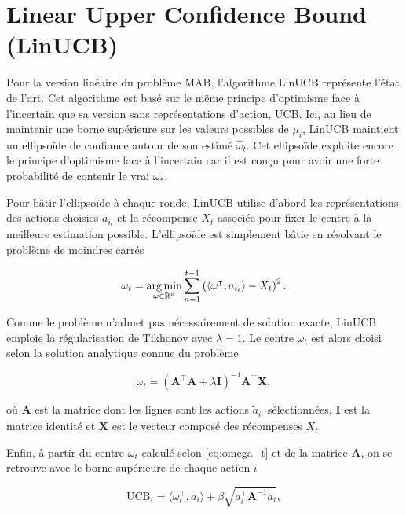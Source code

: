 \section{Linear Upper Confidence Bound (LinUCB)}

Pour la version linéaire du problème MAB, l'algorithme LinUCB \citep{chu2011contextual}
représente l'état de l'art.
Cet algorithme est basé sur le même principe d'optimisme face à l'incertain que
sa version sans représentations d'action, UCB.
Ici, au lieu de maintenir une borne supérieure sur les valeurs possibles de
$\mu_i$, LinUCB maintient un ellipsoïde de confiance autour de son estimé
$\hat{\omega}_t$.
Cet ellipsoïde exploite encore le principe d'optimisme face à l'incertain car il
est conçu pour avoir une forte probabilité de contenir le vrai $\omega_*$.

Pour bâtir l'ellipsoïde à chaque ronde, LinUCB utilise d'abord les
représentations des actions choisies $\tilde{a}_{i_t}$ et la récompense $X_t$ associée pour
fixer le centre à la meilleure estimation possible.
L'ellipsoïde est simplement bâtie en résolvant le problème de moindres carrés

\begin{equation}
    \omega_t = \operatorname*{arg\,min}_{\omega \in \mathbb{R}^n} \sum_{n=1}^{t-1} \left( \langle \omega^\intercal, a_{i_t} \rangle - X_t \right)^2.
\end{equation}

Comme le problème n'admet pas nécessairement de solution exacte, LinUCB emploie la
régularisation de Tikhonov \citep{tikhonov1963solution} avec $\lambda=1$.
Le centre $\omega_t$ est alors choisi selon la solution analytique connue du
problème

\begin{equation}
    \omega_t = (\mathbf{A}^\intercal \mathbf{A} + \lambda \mathbf{I})^{-1}\mathbf{A}^\intercal \mathbf{X},
    \label{eq:omega_t}
\end{equation}

où $\mathbf{A}$ est la matrice dont les lignes sont les actions $\tilde{a}_{i_t}$ sélectionnées,
$\mathbf{I}$ est la matrice identité et $\mathbf{X}$ est le vecteur composé des récompenses $X_t$.

Enfin, à partir du centre $\omega_t$ calculé selon \eqref{eq:omega_t} et de la matrice $\mathbf{A}$,
on se retrouve avec le borne supérieure de chaque action $i$

\begin{equation}
    \text{UCB}_i = \langle \omega_t^\intercal, a_i \rangle + \beta \sqrt{a_i^\intercal \mathbf{A}^{-1} a_i},
\end{equation}

